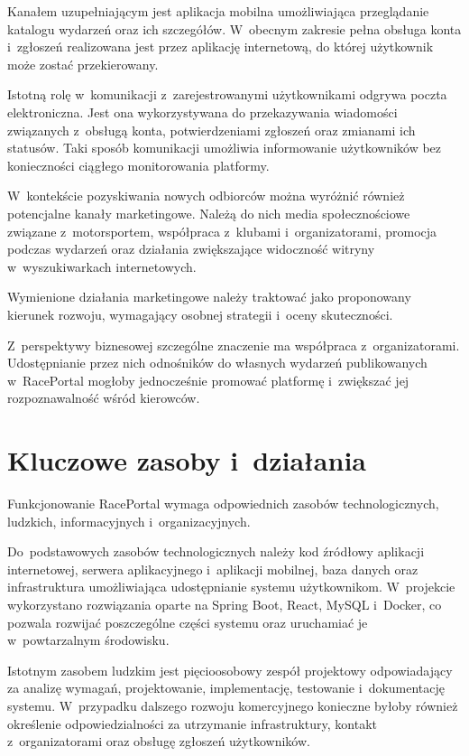 \documentclass{sprz}
\begin{document}
Kanałem uzupełniającym jest aplikacja mobilna umożliwiająca przeglądanie katalogu wydarzeń oraz ich szczegółów. W~obecnym zakresie pełna obsługa konta i~zgłoszeń realizowana jest przez aplikację internetową, do której użytkownik może zostać przekierowany.

Istotną rolę w~komunikacji z~zarejestrowanymi użytkownikami odgrywa poczta elektroniczna. Jest ona wykorzystywana do przekazywania wiadomości związanych z~obsługą konta, potwierdzeniami zgłoszeń oraz zmianami ich statusów. Taki sposób komunikacji umożliwia informowanie użytkowników bez konieczności ciągłego monitorowania platformy.

W~kontekście pozyskiwania nowych odbiorców można wyróżnić również potencjalne kanały marketingowe. Należą do nich media społecznościowe związane z~motorsportem, współpraca z~klubami i~organizatorami, promocja podczas wydarzeń oraz działania zwiększające widoczność witryny w~wyszukiwarkach internetowych.

Wymienione działania marketingowe należy traktować jako proponowany kierunek rozwoju, wymagający osobnej strategii i~oceny skuteczności.

Z~perspektywy biznesowej szczególne znaczenie ma współpraca z~organizatorami. Udostępnianie przez nich odnośników do własnych wydarzeń publikowanych w~RacePortal mogłoby jednocześnie promować platformę i~zwiększać jej rozpoznawalność wśród kierowców.

\section{Kluczowe zasoby i~działania}
Funkcjonowanie RacePortal wymaga odpowiednich zasobów technologicznych, ludzkich, informacyjnych i~organizacyjnych.

Do~podstawowych zasobów technologicznych należy kod źródłowy aplikacji internetowej, serwera aplikacyjnego i~aplikacji mobilnej, baza danych oraz infrastruktura umożliwiająca udostępnianie systemu użytkownikom. W~projekcie wykorzystano rozwiązania oparte na Spring Boot, React, MySQL i~Docker, co pozwala rozwijać poszczególne części systemu oraz uruchamiać je w~powtarzalnym środowisku.

Istotnym zasobem ludzkim jest pięcioosobowy zespół projektowy odpowiadający za analizę wymagań, projektowanie, implementację, testowanie i~dokumentację systemu. W~przypadku dalszego rozwoju komercyjnego konieczne byłoby również określenie odpowiedzialności za utrzymanie infrastruktury, kontakt z~organizatorami oraz obsługę zgłoszeń użytkowników.
\end{document}
